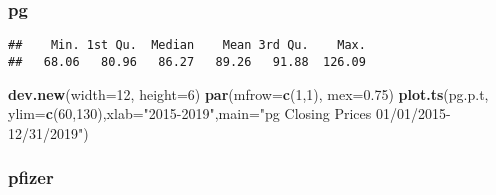 \documentclass[]{article}
\newenvironment{Shaded}{\begin{snugshade}}{\end{snugshade}}
\newcommand{\KeywordTok}[1]{\textcolor[rgb]{0.13,0.29,0.53}{\textbf{#1}}}
\newcommand{\DataTypeTok}[1]{\textcolor[rgb]{0.13,0.29,0.53}{#1}}
\newcommand{\DecValTok}[1]{\textcolor[rgb]{0.00,0.00,0.81}{#1}}
\newcommand{\FloatTok}[1]{\textcolor[rgb]{0.00,0.00,0.81}{#1}}
\newcommand{\StringTok}[1]{\textcolor[rgb]{0.31,0.60,0.02}{#1}}
\newcommand{\OperatorTok}[1]{\textcolor[rgb]{0.81,0.36,0.00}{\textbf{#1}}}
\newcommand{\NormalTok}[1]{#1}
\begin{document}
\subsubsection{pg}\label{pg}

\begin{Shaded}
\end{Shaded}

\begin{verbatim}
##    Min. 1st Qu.  Median    Mean 3rd Qu.    Max. 
##   68.06   80.96   86.27   89.26   91.88  126.09
\end{verbatim}

\begin{Shaded}
\begin{Highlighting}[]
\KeywordTok{dev.new}\NormalTok{(}\DataTypeTok{width=}\DecValTok{12}\NormalTok{, }\DataTypeTok{height=}\DecValTok{6}\NormalTok{)}
\KeywordTok{par}\NormalTok{(}\DataTypeTok{mfrow=}\KeywordTok{c}\NormalTok{(}\DecValTok{1}\NormalTok{,}\DecValTok{1}\NormalTok{), }\DataTypeTok{mex=}\FloatTok{0.75}\NormalTok{)}
\KeywordTok{plot.ts}\NormalTok{(pg.p.t, }\DataTypeTok{ylim=}\KeywordTok{c}\NormalTok{(}\DecValTok{60}\NormalTok{,}\DecValTok{130}\NormalTok{),}\DataTypeTok{xlab=}\StringTok{"2015-2019"}\NormalTok{,}\DataTypeTok{main=}\StringTok{"pg Closing Prices 01/01/2015-12/31/2019"}\NormalTok{)}
\end{Highlighting}
\end{Shaded}

\subsubsection{pfizer}\label{pfizer}

\begin{Shaded}
\end{Shaded}
\end{document}
